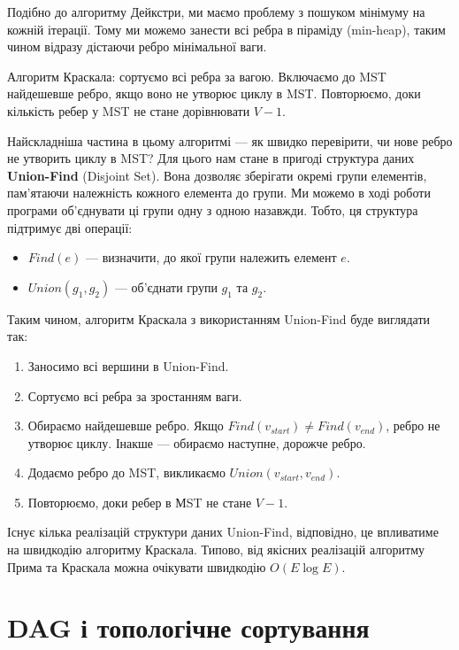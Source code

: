 \documentclass[12pt,a4paper]{report}
\begin{document}
Подібно до алгоритму Дейкстри, ми маємо проблему з пошуком мінімуму на кожній ітерації. Тому ми можемо занести всі ребра в піраміду (min-heap), таким чином відразу дістаючи ребро мінімальної ваги.



Алгоритм Краскала: сортуємо всі ребра за вагою. Включаємо до MST найдешевше ребро, якщо воно не утворює циклу в MST. Повторюємо, доки кількість ребер у MST не стане дорівнювати \(V - 1\).

Найскладніша частина в цьому алгоритмі --- як швидко перевірити, чи нове ребро не утворить циклу в MST? Для цього нам стане в пригоді структура даних \textbf{Union-Find} (Disjoint Set). Вона дозволяє зберігати окремі групи елементів, пам’ятаючи належність кожного елемента до групи. Ми можемо в ході роботи програми об’єднувати ці групи одну з одною назавжди. Тобто, ця структура підтримує дві операції:

\begin{itemize}
    \item \(Find(e)\) --- визначити, до якої групи належить елемент \(e\).
    \item \(Union(g_1, g_2)\) --- об’єднати групи \(g_1\) та \(g_2\).
\end{itemize}

Таким чином, алгоритм Краскала з використанням Union-Find буде виглядати так:

\begin{enumerate}
    \item Заносимо всі вершини в Union-Find.
    \item Сортуємо всі ребра за зростанням ваги.
    \item Обираємо найдешевше ребро. Якщо \(Find(v_{start}) \neq Find(v_{end})\), ребро не утворює циклу. Інакше --- обираємо наступне, дорожче ребро.
    \item Додаємо ребро до MST, викликаємо \(Union(v_{start}, v_{end})\).
    \item Повторюємо, доки ребер в МST не стане \(V - 1\).
\end{enumerate}



Існує кілька реалізацій структури даних Union-Find, відповідно, це впливатиме на швидкодію алгоритму Краскала. Типово, від якісних реалізацій алгоритму Прима та Краскала можна очікувати швидкодію \(O(E \log E)\).



\section{DAG і топологічне сортування}
\end{document}

